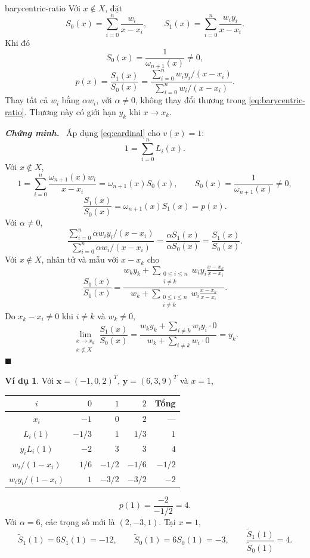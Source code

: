 \documentclass[12pt,a4paper,oneside]{book}
\numberwithin{algorithm}{chapter}
\theoremstyle{definition}
\newtheorem{vidu}{Ví dụ}[chapter]
\newenvironment{chungminh}{\par\medskip\noindent\textbf{\textit{\color{mainblue}Chứng minh.}}\ }{\hfill$\blacksquare$\par\medskip}
\begin{document}
\begin{menhde}{}{barycentric-ratio}
Với $x\notin X$, đặt
\[
 S_0(x)=\sum_{i=0}^n\frac{w_i}{x-x_i},\qquad
 S_1(x)=\sum_{i=0}^n\frac{w_iy_i}{x-x_i}.
\]
Khi đó
\begin{equation}\label{eq:barycentric-denominator}
 S_0(x)=\frac1{\omega_{n+1}(x)}\ne0,
\end{equation}
\begin{equation}\label{eq:barycentric-ratio}
 p(x)=\frac{S_1(x)}{S_0(x)}
 =\frac{\displaystyle\sum_{i=0}^nw_iy_i/(x-x_i)}
        {\displaystyle\sum_{i=0}^nw_i/(x-x_i)}.
\end{equation}
Thay tất cả $w_i$ bằng $\alpha w_i$, với $\alpha\ne0$, không thay đổi thương trong \eqref{eq:barycentric-ratio}. Thương này có giới hạn $y_k$ khi $x\to x_k$.
\end{menhde}
\begin{chungminh}
Áp dụng \eqref{eq:cardinal} cho $v(x)=1$:
\[
 1=\sum_{i=0}^nL_i(x).
\]
Với $x\notin X$,
\[
 1=\sum_{i=0}^n\frac{\omega_{n+1}(x)w_i}{x-x_i}
   =\omega_{n+1}(x)S_0(x),
 \qquad S_0(x)=\frac1{\omega_{n+1}(x)}\ne0,
\]
\[
 \frac{S_1(x)}{S_0(x)}
 =\omega_{n+1}(x)S_1(x)=p(x).
\]
Với $\alpha\ne0$,
\[
 \frac{\displaystyle\sum_{i=0}^n\alpha w_iy_i/(x-x_i)}
      {\displaystyle\sum_{i=0}^n\alpha w_i/(x-x_i)}
 =\frac{\alpha S_1(x)}{\alpha S_0(x)}
 =\frac{S_1(x)}{S_0(x)}.
\]
Với $x\notin X$, nhân tử và mẫu với $x-x_k$ cho
\[
 \frac{S_1(x)}{S_0(x)}
 =\frac{\displaystyle w_ky_k+
       \sum_{\substack{0\leq i\leq n\\i\ne k}}w_iy_i\frac{x-x_k}{x-x_i}}
      {\displaystyle w_k+
       \sum_{\substack{0\leq i\leq n\\i\ne k}}w_i\frac{x-x_k}{x-x_i}}.
\]
Do $x_k-x_i\ne0$ khi $i\ne k$ và $w_k\ne0$,
\[
 \lim_{\substack{x\to x_k\\x\notin X}}\frac{S_1(x)}{S_0(x)}
 =\frac{w_ky_k+\sum_{i\ne k}w_iy_i\cdot0}
       {w_k+\sum_{i\ne k}w_i\cdot0}=y_k.
\]
\end{chungminh}

\begin{vidu}
Với $\mathbf x=(-1,0,2)^T$, $\mathbf y=(6,3,9)^T$ và $x=1$,
\begin{center}
\begin{tabular}{c|rrr|r}
\toprule
$i$ & $0$ & $1$ & $2$ & Tổng\\
\midrule
$x_i$ & $-1$ & $0$ & $2$ & ---\\
$L_i(1)$ & $-1/3$ & $1$ & $1/3$ & $1$\\
$y_iL_i(1)$ & $-2$ & $3$ & $3$ & $4$\\
$w_i/(1-x_i)$ & $1/6$ & $-1/2$ & $-1/6$ & $-1/2$\\
$w_iy_i/(1-x_i)$ & $1$ & $-3/2$ & $-3/2$ & $-2$\\
\bottomrule
\end{tabular}
\end{center}
\[
 p(1)=\frac{-2}{-1/2}=4.
\]
Với $\alpha=6$, các trọng số mới là $(2,-3,1)$. Tại $x=1$,
\[
 \widetilde S_1(1)=6S_1(1)=-12,
 \qquad\widetilde S_0(1)=6S_0(1)=-3,
 \qquad\frac{\widetilde S_1(1)}{\widetilde S_0(1)}=4.
\]
\end{vidu}
\end{document}

